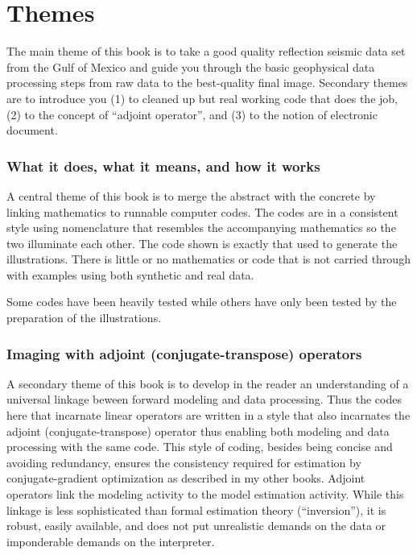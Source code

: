 \chapter*{Themes}

The main theme of this book is to take a good quality reflection
seismic data set from the Gulf of Mexico and guide you through the
basic geophysical data processing steps from raw data to the
best-quality final image. Secondary themes are to introduce you (1) to
cleaned up but real working %
code that does the job, (2) to the
concept of “adjoint operator”, and (3) to the notion of electronic
document.

\subsection*{What it does, what it means, and how it works}
A central theme of this book is to merge the abstract with the
concrete by linking mathematics to runnable computer codes. The codes
are in a consistent style using nomenclature that resembles the
accompanying mathematics so the two illuminate each other. The code
shown is exactly that used to generate the illustrations. There is
little or no mathematics or code that is not carried through with
examples using both synthetic and real data.


Some codes have been heavily tested while others have
only been tested by the preparation of the illustrations.

\subsection*{Imaging with adjoint (conjugate-transpose) operators}

A secondary theme of this book is to develop in the reader an
understanding of a universal linkage beween forward modeling and data
processing. Thus the codes here that incarnate linear operators are
written in a style that also incarnates the adjoint
(conjugate-transpose) operator thus enabling both modeling and data
processing with the same code. This style of coding, besides being
concise and avoiding redundancy, ensures the consistency required for
estimation by conjugate-gradient optimization as described in my other
books.  Adjoint operators link the modeling activity to the model
estimation activity. While this linkage is less sophisticated than
formal estimation theory (“inversion”), it is robust, easily
available, and does not put unrealistic demands on the data or
imponderable demands on the interpreter.


